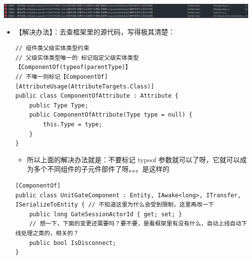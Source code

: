 \documentclass[9pt, b5paper]{article}
\begin{document}
\begin{center}
\includegraphics[width=.9\linewidth]{./pic/et4_20230616_165317.png}
\end{center}
\begin{itemize}
\item 【解决办法】：去查框架里的源代码，写得极其清楚：
\begin{verbatim}
// 组件类父级实体类型约束
// 父级实体类型唯一的 标记指定父级实体类型【ComponentOf(typeof(parentType)】
// 不唯一则标记【ComponentOf]
[AttributeUsage(AttributeTargets.Class)]
public class ComponentOfAttribute : Attribute {
    public Type Type;
    public ComponentOfAttribute(Type type = null) {
        this.Type = type;
    }
}
\end{verbatim}
\begin{itemize}
\item 所以上面的解决办法就是：不要标记 typeof 参数就可以了呀，它就可以成为多个不同组件的子元件部件了呀。。。是这样的
\end{itemize}
\begin{verbatim}
[ComponentOf] 
public class UnitGateComponent : Entity, IAwake<long>, ITransfer, ISerializeToEntity { // 不知道这里为什么会受到限制，这里再改一下
    public long GateSessionActorId { get; set; }
    // 想一下，下面的变更还需要吗？要不要，是看框架里有没有什么，自动上线自动下线处理之类的，相关的？
    public bool IsDisconnect;
}
\end{verbatim}
\end{itemize}
\end{document}
